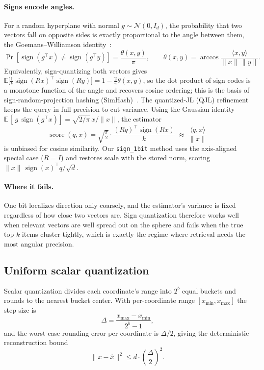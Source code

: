 \documentclass[11pt]{article}
\begin{document}
\paragraph{Signs encode angles.} For a random hyperplane with normal $g \sim \mathcal{N}(0, I_d)$, the probability that two vectors fall on opposite sides is exactly proportional to the angle between them, the Goemans--Williamson identity~\cite{goemans1995}:
\begin{equation}
\Pr\!\left[\operatorname{sign}(g^\top x) \ne \operatorname{sign}(g^\top y)\right] = \frac{\theta(x,y)}{\pi}, \qquad \theta(x,y) = \arccos\frac{\langle x, y\rangle}{\|x\|\,\|y\|}.
\end{equation}
Equivalently, sign-quantizing both vectors gives $\mathbb{E}\bigl[\tfrac1k \operatorname{sign}(Rx)^\top \operatorname{sign}(Ry)\bigr] = 1 - \tfrac{2}{\pi}\theta(x,y)$, so the dot product of sign codes is a monotone function of the angle and recovers cosine ordering; this is the basis of sign-random-projection hashing (SimHash)~\cite{charikar2002}. The quantized-JL (QJL) refinement keeps the query in full precision to cut variance. Using the Gaussian identity $\mathbb{E}\,[\,g\,\operatorname{sign}(g^\top x)] = \sqrt{2/\pi}\,x/\|x\|$, the estimator
\begin{equation}
\operatorname{score}(q, x) = \sqrt{\tfrac{\pi}{2}}\cdot\frac{(Rq)^\top \operatorname{sign}(Rx)}{k} \;\approx\; \frac{\langle q, x\rangle}{\|x\|}
\end{equation}
is unbiased for cosine similarity. Our \texttt{sign\_1bit} method uses the axis-aligned special case ($R = I$) and restores scale with the stored norm, scoring $\|x\|\,\operatorname{sign}(x)^\top q / \sqrt{d}$.

\paragraph{Where it fails.} One bit localizes direction only coarsely, and the estimator's variance is fixed regardless of how close two vectors are. Sign quantization therefore works well when relevant vectors are well spread out on the sphere and fails when the true top-$k$ items cluster tightly, which is exactly the regime where retrieval needs the most angular precision.

\subsection{Uniform scalar quantization}

Scalar quantization divides each coordinate's range into $2^b$ equal buckets and rounds to the nearest bucket center. With per-coordinate range $[x_{\min}, x_{\max}]$ the step size is
\begin{equation}
\Delta = \frac{x_{\max} - x_{\min}}{2^b - 1},
\end{equation}
and the worst-case rounding error per coordinate is $\Delta/2$, giving the deterministic reconstruction bound
\begin{equation}
\|x - \hat{x}\|^2 \le d \cdot \left(\frac{\Delta}{2}\right)^2.
\end{equation}
\end{document}
